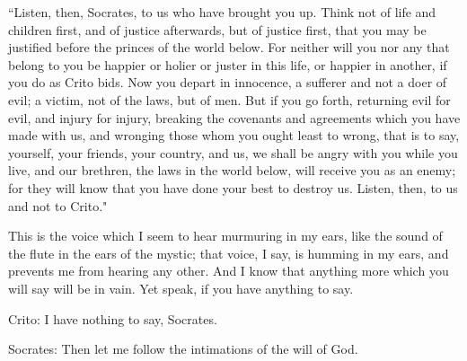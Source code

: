 ``Listen, then, Socrates, to us who have brought you up. Think not
of life and children first, and of justice afterwards, but of justice
first, that you may be justified before the princes of the world below.
For neither will you nor any that belong to you be happier or holier
or juster in this life, or happier in another, if you do as Crito
bids. Now you depart in innocence, a sufferer and not a doer of evil;
a victim, not of the laws, but of men. But if you go forth, returning
evil for evil, and injury for injury, breaking the covenants and agreements
which you have made with us, and wronging those whom you ought least
to wrong, that is to say, yourself, your friends, your country, and
us, we shall be angry with you while you live, and our brethren, the
laws in the world below, will receive you as an enemy; for they will
know that you have done your best to destroy us. Listen, then, to
us and not to Crito." 

This is the voice which I seem to hear murmuring in my ears, like
the sound of the flute in the ears of the mystic; that voice, I say,
is humming in my ears, and prevents me from hearing any other. And
I know that anything more which you will say will be in vain. Yet
speak, if you have anything to say. 

Crito: I have nothing to say, Socrates. 

Socrates: Then let me follow the intimations of the will of God.



